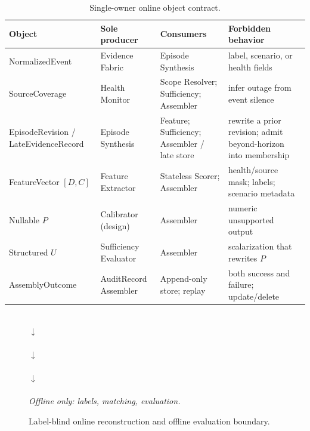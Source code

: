 \begin{table}[!t]
\caption{Single-owner online object contract.}
\label{tab:ownership}
\centering
\scriptsize
\begin{tabular}{p{}p{}p{}p{}}
\toprule
\textbf{Object} & \textbf{Sole producer} & \textbf{Consumers} & \textbf{Forbidden behavior} \\
\midrule
NormalizedEvent & Evidence Fabric & Episode Synthesis & label, scenario, or health fields \\
SourceCoverage & Health Monitor & Scope Resolver; Sufficiency; Assembler & infer outage from event silence \\
EpisodeRevision / LateEvidenceRecord & Episode Synthesis & Feature; Sufficiency; Assembler / late store & rewrite a prior revision; admit beyond-horizon into membership \\
FeatureVector $[D,C]$ & Feature Extractor & Stateless Scorer; Assembler & health/source mask; labels; scenario metadata \\
Nullable $P$ & Calibrator (design) & Assembler & numeric unsupported output \\
Structured $U$ & Sufficiency Evaluator & Assembler & scalarization that rewrites $P$ \\
AssemblyOutcome & AuditRecord Assembler & Append-only store; replay & both success and failure; update/delete \\
\bottomrule
\end{tabular}
\end{table}

\begin{figure}[t]
  \centering
  \scriptsize
  \setlength{\fboxsep}{5pt}
  \begin{minipage}{\columnwidth}\centering
  \\[2pt]
  $\downarrow$\\[2pt]
  \\[2pt]
  $\downarrow$\\[2pt]
  \\[2pt]
  $\downarrow$\\[2pt]
  \\[2pt]
  \textit{Offline only: labels, matching, evaluation.}
  \end{minipage}
  \caption{Label-blind online reconstruction and offline evaluation boundary.}
  \label{fig:method-architecture}
\end{figure}

